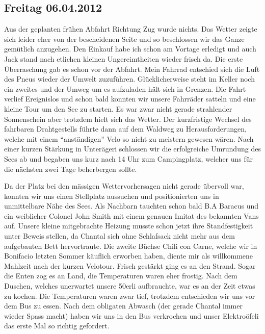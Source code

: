 % 
%

\subsection{Freitag 06.04.2012}
Aus der geplanten frühen Abfahrt Richtung Zug wurde nichts.
Das Wetter zeigte sich leider eher von der bescheidenen Seite und so beschlossen wir das Ganze gemütlich anzugehen.
Den Einkauf habe ich schon am Vortage erledigt und auch Jack stand nach etlichen kleinen Ungereimtheiten wieder frisch da.
Die erste Überraschung gab es schon vor der Abfahrt.
Mein Fahrrad entschied sich die Luft des Pneus wieder der Umwelt zuzuführen.
Glücklicherweise steht im Keller noch ein zweites und der Umweg um es aufzuladen hält sich in Grenzen.
Die Fahrt verlief Ereignislos und schon bald konnten wir unsere Fahrräder satteln und eine kleine Tour um den See zu starten.
Es war zwar nicht gerade strahlender Sonnenschein aber trotzdem hielt sich das Wetter.
Der kurzfristige Wechsel des fahrbaren Drahtgestells führte dann auf dem Waldweg zu Herausforderungen, welche mit einem "`anständigen"' Velo so nicht zu meistern gewesen wären.
Nach einer kurzen Stärkung in Unterägeri schlossen wir die erfolgreiche Umrundung des Sees ab und begaben uns kurz nach 14 Uhr zum Campingplatz, welcher uns für die nächsten zwei Tage beherbergen sollte.

Da der Platz bei den mässigen Wettervorhersagen nicht gerade übervoll war, konnten wir uns einen Stellplatz aussuchen und positionierten uns in unmittelbare Nähe des Sees.
Als Nachbarn tauchten schon bald B.A Baracus und ein weiblicher Colonel John Smith mit einem genauen Imitat des bekannten Vans auf.
Unsere kleine mitgebrachte Heizung musste schon jetzt ihre Standfestigkeit unter Beweis stellen, da Chantal sich ohne Schlafsack nicht mehr aus dem aufgebauten Bett hervortraute.
Die zweite Büchse Chili con Carne, welche wir in Bonifacio letzten Sommer käuflich erworben haben, diente mir als willkommene Mahlzeit nach der kurzen Velotour.
Frisch gestärkt ging es an den Strand.
Sogar die Enten zog es an Land, die Temperaturen waren eher frostig. 
Nach dem Duschen, welches unerwartet unsere 50erli aufbrauchte, war es an der Zeit etwas zu kochen.
Die Temperaturen waren zwar tief, trotzdem entschieden wir uns vor dem Bus zu essen.
Nach dem obligaten Abwasch (der gerade Chantal immer wieder Spass macht) haben wir uns in den Bus verkrochen und unser Elektroöfeli das erste Mal so richtig gefordert.

